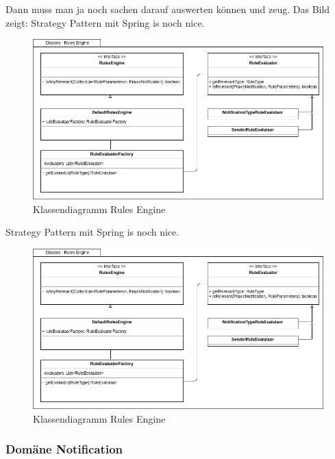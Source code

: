\clearpage
Dann muss man ja noch sachen darauf auswerten können und zeug.
Das Bild zeigt: Strategy Pattern mit Spring is noch nice.

\begin{figure}[h]
    \centering
    \begin{minipage}[b]{1.0\textwidth}
        \includegraphics[width=\textwidth]{graphics/Class_Configuration_RulesEngine}
        \caption{Klassendiagramm Rules Engine}
    \end{minipage}
\end{figure}

\clearpage
Strategy Pattern mit Spring is noch nice.

\begin{figure}[h]
    \centering
    \begin{minipage}[b]{1.0\textwidth}
        \includegraphics[width=\textwidth]{graphics/Class_Configuration_RulesEngine}
        \caption{Klassendiagramm Rules Engine}
    \end{minipage}
\end{figure}

\clearpage
\subsubsection*{Domäne Notification}

